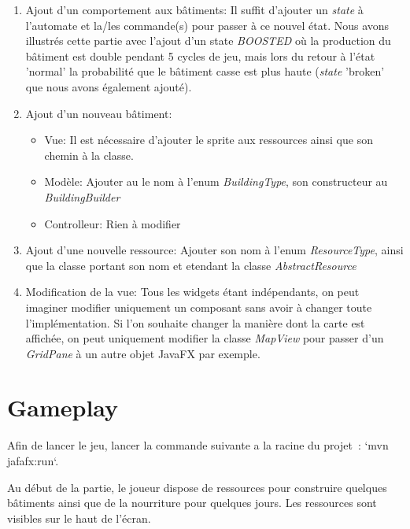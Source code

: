 \documentclass{article}
\begin{document}
\begin{enumerate}
    \item Ajout d'un comportement aux bâtiments: Il suffit d'ajouter un \textit{state} à l'automate et la/les commande(s) pour passer à ce nouvel état. Nous avons
    illustrés cette partie avec l'ajout d'un state \textit{BOOSTED} où la production du bâtiment est double pendant 5 cycles de jeu, mais lors du retour à
    l'état 'normal' la probabilité que le bâtiment casse est plus haute (\textit{state} 'broken' que nous avons également ajouté).
    \item Ajout d'un nouveau bâtiment: 
        \begin{itemize}
            \item Vue: Il est nécessaire d'ajouter le sprite aux ressources ainsi que son chemin à la classe.
            \item Modèle: Ajouter au le nom à l'enum \textit{BuildingType}, son constructeur au \textit{BuildingBuilder}
            \item Controlleur: Rien à modifier
        \end{itemize}
    \item Ajout d'une nouvelle ressource: Ajouter son nom à l'enum \textit{ResourceType}, ainsi que la classe portant son nom et etendant la classe \textit{AbstractResource}
    \item Modification de la vue: Tous les widgets étant indépendants, on peut imaginer modifier uniquement un composant sans avoir à changer toute l'implémentation. Si l'on
    souhaite changer la manière dont la carte est affichée, on peut uniquement modifier la classe \textit{MapView} pour passer d'un \textit{GridPane} à un autre objet JavaFX
    par exemple. 
\end{enumerate}

\section{Gameplay}

Afin de lancer le jeu, lancer la commande suivante a la racine du projet : `mvn jafafx:run`.


Au début de la partie, le joueur dispose de ressources pour construire quelques bâtiments ainsi
que de la nourriture pour quelques jours. Les ressources sont visibles sur le haut de l'écran.
\end{document}
